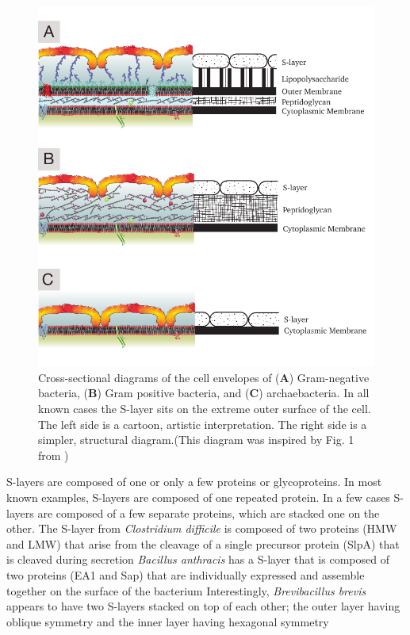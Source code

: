 \begin{figure}[htb] %
  \begin{center}
    \includegraphics{intro/img/celwalls.pdf}
  \end{center}
  \caption[Cross-sectional diagrams of \ac{S-layer} containing cell envelopes]{Cross-sectional
    diagrams of the cell envelopes of (\textbf{A}) Gram-negative bacteria, (\textbf{B}) Gram
    positive bacteria, and (\textbf{C}) archaebacteria. In all known cases the \ac{S-layer} sits on
    the extreme outer surface of the cell. The left side is a cartoon, artistic interpretation. The right side is a simpler, structural diagram.(This diagram was inspired by Fig. 1 from
    )}
  \label{fig:cellwalls}
\end{figure}

\Acp{S-layer} are composed of one or only a few proteins or glycoproteins. In most known examples,
\acp{S-layer} are composed of one repeated protein. In a few cases \acp{S-layer} are composed
of a few separate proteins, which are stacked one on the other. The \ac{S-layer} from \textit{Clostridium difficile} is composed of two
proteins (HMW and LMW) that arise from the cleavage of a single precursor protein (SlpA) that is
cleaved during secretion \textit{Bacillus
  anthracis} has a \ac{S-layer} that is composed of two proteins (EA1 and Sap) that are individually
expressed and assemble together on the surface of the bacterium
Interestingly, \textit{Brevibacillus brevis} appears to have two \acp{S-layer} stacked on top of each
other; the outer layer having oblique symmetry and the inner layer having hexagonal
symmetry
    
